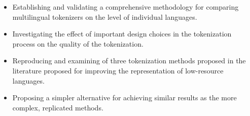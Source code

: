 \begin{itemize}
    \item Establishing and validating a comprehensive methodology for comparing multilingual tokenizers on the level of individual languages.
    \item Investigating the effect of important design choices in the tokenization process on the quality of the tokenization.
    \item Reproducing and examining of three tokenization methods proposed in the literature proposed for improving the representation of low-resource languages.
    \item Proposing a simpler alternative for achieving similar results as the more complex, replicated methods.
\end{itemize}






